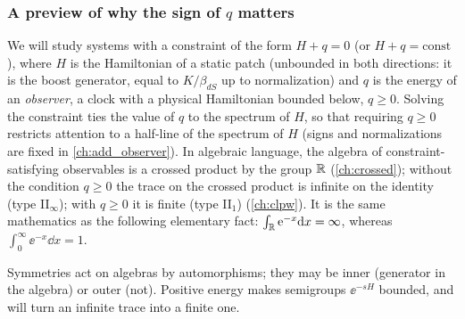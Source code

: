 \subsubsection*{A preview of why the sign of $q$ matters}
We will study systems with a constraint of the form $H+q=0$ (or $H+q=\text{const}$), where $H$ is the Hamiltonian of a static patch (unbounded in both directions: it is the boost generator, equal to $K/\beta_{dS}$ up to normalization) and $q$ is the energy of an \emph{observer}, a clock with a physical Hamiltonian bounded below, $q\ge0$. Solving the constraint ties the value of $q$ to the spectrum of $H$, so that requiring $q\ge0$ restricts attention to a half-line of the spectrum of $H$ (signs and normalizations are fixed in \cref{ch:add_observer}). In algebraic language, the algebra of constraint-satisfying observables is a crossed product by the group $\mathbb{R}$ (\cref{ch:crossed}); without the condition $q\ge0$ the trace on the crossed product is infinite on the identity (type II$_\infty$); with $q\ge0$ it is finite (type II$_1$) (\cref{ch:clpw}). It is the same mathematics as the following elementary fact: $\int_{\mathbb{R}}\mathrm{e}^{-x}\mathrm{d} x=\infty$, whereas $\int_0^\infty\ee^{-x}\dd x=1$.

\begin{keyidea}
Symmetries act on algebras by automorphisms; they may be inner (generator in the algebra) or outer (not). Positive energy makes semigroups $\ee^{-sH}$ bounded, and will turn an infinite trace into a finite one.
\end{keyidea}

